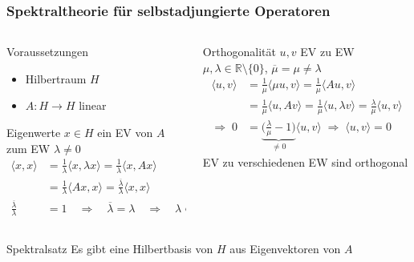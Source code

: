 %
%
%
\bgroup
\begin{frame}[t]
\setlength{\abovedisplayskip}{5pt}
\setlength{\belowdisplayskip}{5pt}
\frametitle{Spektraltheorie für selbstadjungierte Operatoren}
\vspace{-20pt}
\begin{columns}[t,onlytextwidth]
\begin{column}{0.48\textwidth}
\begin{block}{Voraussetzungen}
\begin{itemize}
\item
Hilbertraum $H$
\item
$A\colon H\to H$ linear
\end{itemize}
\end{block}
\begin{block}{Eigenwerte}
$x\in H$ ein EV von $A$ zum EW $\lambda\ne 0$
\begin{align*}
\langle x,x\rangle
&=
\frac1{\lambda}
\langle x,\lambda x\rangle
=
\frac1{\lambda}
\langle x,Ax\rangle
\\
&=
\frac1{\lambda}
\langle Ax,x\rangle
=
\frac{\overline{\lambda}}{\lambda}
\langle x,x\rangle
\\
\frac{\overline{\lambda}}{\lambda}&=1
\quad\Rightarrow\quad
\overline{\lambda} = \lambda
\quad\Rightarrow\quad
\lambda\in\mathbb{R}
\end{align*}
\end{block}
\end{column}
\begin{column}{0.48\textwidth}
\begin{block}{Orthogonalität}
$u,v$ EV zu EW $\mu,\lambda\in \mathbb{R}\setminus\{0\}$, $\overline{\mu}=\mu\ne\lambda$
\begin{align*}
\langle u,v\rangle
&=
\frac{1}{\mu}
\langle \mu u,v\rangle
=
\frac{1}{\mu}
\langle Au,v\rangle
\\
&=
\frac{1}{\mu}
\langle u,Av\rangle
=
\frac{1}{\mu}
\langle u,\lambda v\rangle
=
\frac{\lambda}{\mu}
\langle u,v\rangle
\\
\Rightarrow
\;
0
&=
\underbrace{\biggl(\frac{\lambda}{\mu}-1\biggr)}_{\displaystyle \ne 0}
\langle u,v\rangle
\;\Rightarrow\;
\langle u,v\rangle = 0
\end{align*}
EV zu verschiedenen EW sind orthogonal
\end{block}
\end{column}
\end{columns}
\begin{block}{Spektralsatz}
Es gibt eine Hilbertbasis von $H$ aus Eigenvektoren von $A$
\end{block}
\end{frame}
\egroup
